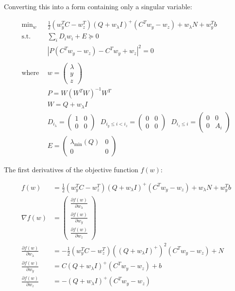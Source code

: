 \documentclass{article}
\begin{document}
Converting this into a form containing only a singular variable:

\begin{align}
	\text{min}_{w} ~ &\frac{1}{2} (w_y^T C - w_z^T) (Q+w_\lambda I)^+ (C^Tw_y - w_z) + w_\lambda N + w_y^T b \\ 
	\text{s.t.} ~~ &\sum_i D_i w_i + E \succeq 0 \\
			    &|P(C^Tw_y-w_z)-C^T w_y+w_z|^2 = 0 \\ 
				\\
				\text{where} ~~ &w = \begin{pmatrix}\lambda \\ y \\ z \end{pmatrix} \\
				&P = W (W^T W)^{-1} W^T \\
								&W = Q+w_\lambda I \\
								&D_{i_\lambda} = \begin{pmatrix}1 & 0 \\ 0 & 0 \end{pmatrix} ~~~ D_{i_y\le i<i_z} = \begin{pmatrix}0 & 0 \\ 0 & 0 \end{pmatrix} ~~~ D_{i_z \le i} = \begin{pmatrix}0 & 0 \\ 0 & A_i \end{pmatrix} \\
								&E = \begin{pmatrix}\lambda_\text{min}(Q) & 0 \\ 0 & 0 \end{pmatrix} 
\end{align}

\pagebreak
The first derivatives of the objective function $f(w)$:

\begin{align}
	f(w) &= \frac{1}{2} (w_y^T C - w_z^T) (Q+w_\lambda I)^+ (C^Tw_y - w_z) + w_\lambda N + w_y^T b \\ 
		   \nabla f(w) &= \begin{pmatrix} \frac{\partial f(w)}{\partial w_\lambda} \\ \frac{\partial f(w)}{\partial w_y} \\ \frac{\partial f(w)}{\partial w_z} \end{pmatrix} \\
		   \frac{\partial f(w)}{\partial w_\lambda} &= -\frac{1}{2} (w_y^T C - w_z^T) ((Q+w_\lambda I)^+)^2 (C^Tw_y - w_z) +N \\
		   \frac{\partial f(w)}{\partial w_y} &= C (Q+w_\lambda I)^+ (C^Tw_y - w_z) + b \\
		   \frac{\partial f(w)}{\partial w_z} &= - (Q+w_\lambda I)^+ (C^Tw_y - w_z)
\end{align}
\end{document}
